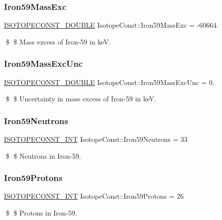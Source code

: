 \subsubsection{\texorpdfstring{Iron59\+Mass\+Exc}{Iron59MassExc}}
{\footnotesize\ttfamily \mbox{\hyperlink{group___isotope_const-_macros_ga8f45a7272ce02c0b4c65c44636ed719a}{I\+S\+O\+T\+O\+P\+E\+C\+O\+N\+S\+T\+\_\+\+D\+O\+U\+B\+LE}} Isotope\+Const\+::\+Iron59\+Mass\+Exc = -\/60664.}

\$ \$ Mass excess of Iron-\/59 in keV. \mbox{\label{group___isotope_const-_iron-_fe59_gaf02397ae50eb6112be32af45dab724b6}} 
\subsubsection{\texorpdfstring{Iron59\+Mass\+Exc\+Unc}{Iron59MassExcUnc}}
{\footnotesize\ttfamily \mbox{\hyperlink{group___isotope_const-_macros_ga8f45a7272ce02c0b4c65c44636ed719a}{I\+S\+O\+T\+O\+P\+E\+C\+O\+N\+S\+T\+\_\+\+D\+O\+U\+B\+LE}} Isotope\+Const\+::\+Iron59\+Mass\+Exc\+Unc = 0.}

\$ \$ Uncertainty in mass excess of Iron-\/59 in keV. \mbox{\label{group___isotope_const-_iron-_fe59_gab8b2d23d67d642c248459daa16503d80}} 
\subsubsection{\texorpdfstring{Iron59\+Neutrons}{Iron59Neutrons}}
{\footnotesize\ttfamily \mbox{\hyperlink{group___isotope_const-_macros_ga5f18360b3e99483a35c32d789e62621c}{I\+S\+O\+T\+O\+P\+E\+C\+O\+N\+S\+T\+\_\+\+I\+NT}} Isotope\+Const\+::\+Iron59\+Neutrons = 33}

\$ \$ Neutrons in Iron-\/59. \mbox{\label{group___isotope_const-_iron-_fe59_ga41631ea4b64fc2c30dab39cf816ae444}} 
\subsubsection{\texorpdfstring{Iron59\+Protons}{Iron59Protons}}
{\footnotesize\ttfamily \mbox{\hyperlink{group___isotope_const-_macros_ga5f18360b3e99483a35c32d789e62621c}{I\+S\+O\+T\+O\+P\+E\+C\+O\+N\+S\+T\+\_\+\+I\+NT}} Isotope\+Const\+::\+Iron59\+Protons = 26}

\$ \$ Protons in Iron-\/59. 